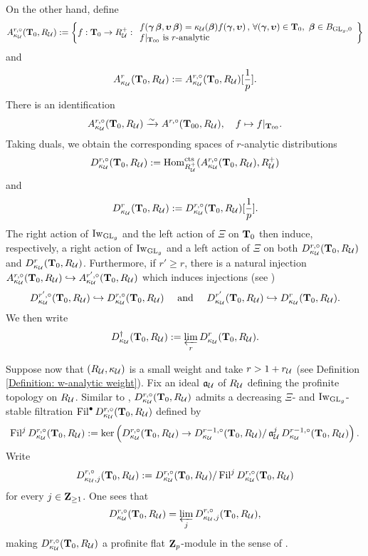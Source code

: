 On the other hand, define 
$$A^{r, \circ}_{\kappa_{\calU}}(\T_0, R_{\calU}):=\left\{f:\T_0\rightarrow R_{\calU}^+: \begin{array}{l}
    f(\bfgamma\bfbeta, \bfupsilon\bfbeta)=\kappa_{\calU}(\bfbeta)f(\bfgamma, \bfupsilon)\,,\,\forall (\bfgamma, \bfupsilon)\in \T_0, \,\,\bfbeta\in B_{\GL_g, 0}\\
    f|_{\T_{00}} \text{ is $r$-analytic}
\end{array}\right\}$$
and
$$A^{r}_{\kappa_{\calU}}(\T_0, R_{\calU}):=A^{r, \circ}_{\kappa_{\calU}}(\T_0, R_{\calU})[\frac{1}{p}].$$
There is an identification $$A_{\kappa_{\calU}}^{r, \circ}(\T_0, R_{\calU})\xrightarrow{\sim} A^{r, \circ}(\T_{00}, R_{\calU}), \quad f\mapsto f|_{\T_{00}}.$$ 
Taking duals, we obtain the corresponding spaces of $r$-analytic distributions
$$
    D_{\kappa_{\calU}}^{r, \circ}(\T_0, R_{\calU}):=\Hom_{R_{\calU}^+}^{\cts}(A_{\kappa_{\calU}}^{r, \circ}(\T_0, R_{\calU}), R_{\calU}^+)
$$
and
$$
D_{\kappa_{\calU}}^{r}(\T_0, R_{\calU}):=D_{\kappa_{\calU}}^{r, \circ}(\T_0, R_{\calU})[\frac{1}{p}].
$$
 The right action of $\Iw_{\GL_g}$ and the left action of $\Xi$ on $\T_0$ then induce, respectively, a right action of $\Iw_{\GL_g}$ and a left action of $\Xi$ on both $D_{\kappa_{\calU}}^{r, \circ}(\T_0, R_{\calU})$ and $D_{\kappa_{\calU}}^{r}(\T_0, R_{\calU})$. Furthermore, if $r'\geq r$, there is a natural injection $A_{\kappa_{\calU}}^{r, \circ}(\T_0, R_{\calU})\hookrightarrow A_{\kappa_{\calU}}^{r', \circ}(\T_0, R_{\calU})$ which induces injections (see \cite[\S 2.2]{Hansen-PhD}) \begin{align*}
    D_{\kappa_{\calU}}^{r', \circ}(\T_0, R_{\calU})\hookrightarrow D_{\kappa_{\calU}}^{r, \circ}(\T_0, R_{\calU})\quad \text{ and }\quad D_{\kappa_{\calU}}^{r'}(\T_0, R_{\calU})\hookrightarrow D_{\kappa_{\calU}}^{r}(\T_0, R_{\calU}).
\end{align*} We then write \[
    D_{\kappa_{\calU}}^{\dagger}(\T_0, R_{\calU}) := \varprojlim_{r} D_{\kappa_{\calU}}^{r}(\T_0, R_{\calU}).
\]

Suppose now that $(R_{\calU}, \kappa_{\calU})$ is a small weight and take $r>1+r_{\calU}$ (see Definition \ref{Definition: w-analytic weight}). Fix an ideal $\fraka_{\calU}$ of $R_{\calU}$ defining the profinite topology on $R_{\calU}$. Similar to \cite[Proposition 3.1]{CHJ-2017}, $D_{\kappa_{\calU}}^{r, \circ}(\T_0, R_{\calU})$ admits a decreasing $\Xi$- and $\Iw_{\GL_g}$-stable filtration $\Fil^{\bullet} D_{\kappa_{\calU}}^{r, \circ}(\T_0, R_{\calU})$ defined by $$\Fil^jD_{\kappa_{\calU}}^{r, \circ}(\T_0, R_{\calU}):=\ker\left(D_{\kappa_{\calU}}^{r, \circ}(\T_0, R_{\calU})\rightarrow D_{\kappa_{\calU}}^{r-1, \circ}(\T_0, R_{\calU})/\fraka_{\calU}^jD_{\kappa_{\calU}}^{r-1, \circ}(\T_0, R_{\calU})\right).$$ Write $$D_{\kappa_{\calU}, j}^{r, \circ}(\T_0, R_{\calU}):=D_{\kappa_{\calU}}^{r, \circ}(\T_0, R_{\calU})/\Fil^j D_{\kappa_{\calU}}^{r, \circ}(\T_0, R_{\calU})$$ for every $j\in \Z_{\geq 1}$. One sees that $$D_{\kappa_{\calU}}^{r, \circ}(\T_0, R_{\calU})=\varprojlim_{j} D_{\kappa_{\calU}, j}^{r, \circ}(\T_0, R_{\calU}),$$ making $D_{\kappa_{\calU}}^{r, \circ}(\T_0, R_{\calU})$ a profinite flat $\Z_p$-module in the sense of \cite[Definition 6.1]{CHJ-2017}.

